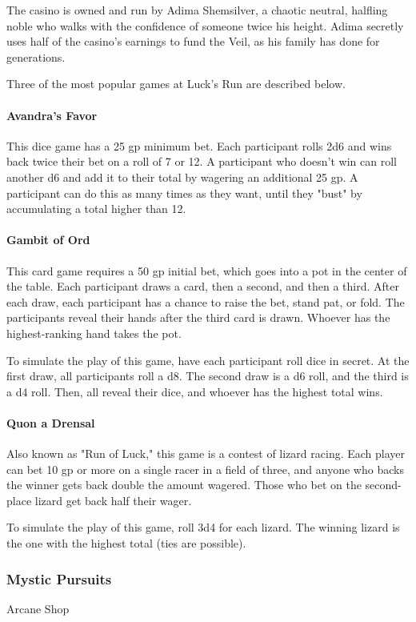 \documentclass[10pt,a4paper,twoside,bg=print,twocolumn,openany,nodeprecatedcode]{dndbook}
\begin{document}
The casino is owned and run by Adima Shemsilver, a chaotic neutral, halfling noble who walks with the confidence of someone twice his height. Adima secretly uses half of the casino's earnings to fund the Veil, as his family has done for generations.

Three of the most popular games at Luck's Run are described below.

\paragraph{Avandra's Favor}
This dice game has a 25 gp minimum bet. Each participant rolls 2d6 and wins back twice their bet on a roll of 7 or 12. A participant who doesn't win can roll another d6 and add it to their total by wagering an additional 25 gp. A participant can do this as many times as they want, until they "bust" by accumulating a total higher than 12.

\paragraph{Gambit of Ord}
This card game requires a 50 gp initial bet, which goes into a pot in the center of the table. Each participant draws a card, then a second, and then a third. After each draw, each participant has a chance to raise the bet, stand pat, or fold. The participants reveal their hands after the third card is drawn. Whoever has the highest-ranking hand takes the pot.

To simulate the play of this game, have each participant roll dice in secret. At the first draw, all participants roll a d8. The second draw is a d6 roll, and the third is a d4 roll. Then, all reveal their dice, and whoever has the highest total wins.

\paragraph{Quon a Drensal}
Also known as "Run of Luck," this game is a contest of lizard racing. Each player can bet 10 gp or more on a single racer in a field of three, and anyone who backs the winner gets back double the amount wagered. Those who bet on the second-place lizard get back half their wager.

To simulate the play of this game, roll 3d4 for each lizard. The winning lizard is the one with the highest total (ties are possible).

\subsubsection{Mystic Pursuits}
Arcane Shop
\end{document}
